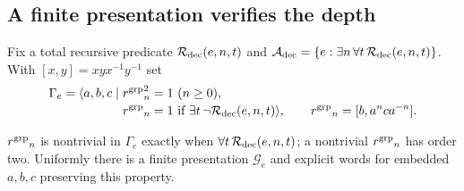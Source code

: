 \subsection{A finite presentation verifies the depth}\label{sec:group}
Fix a total recursive predicate $\mathcal R_{\rm dec}(e,n,t)$ and $\mathcal A_{\rm dec}=\{e:\exists n\,\forall t\,\mathcal R_{\rm dec}(e,n,t)\}$. With $[x,y]=xyx^{-1}y^{-1}$ set
\begin{equation}\label{eq:group}
 \begin{split}
 \Gamma_e=\langle a,b,c\mid {}&
 {r^{\rm grp}}_n^2=1\ (n\geq0),\\[-2pt]
 &{r^{\rm grp}}_n=1\text{ if }\exists t\,\neg\mathcal R_{\rm dec}(e,n,t)\rangle,
 \qquad {r^{\rm grp}}_n=[b,a^nca^{-n}].
 \end{split}
\end{equation}
\begin{lemma}\label{lem:group}
${r^{\rm grp}}_n$ is nontrivial in $\Gamma_e$ exactly when $\forall t\,\mathcal R_{\rm dec}(e,n,t)$; a nontrivial ${r^{\rm grp}}_n$ has order two. Uniformly there is a finite presentation $\mathcal G_e$ and explicit words for embedded $a,b,c$ preserving this property.
\end{lemma}
